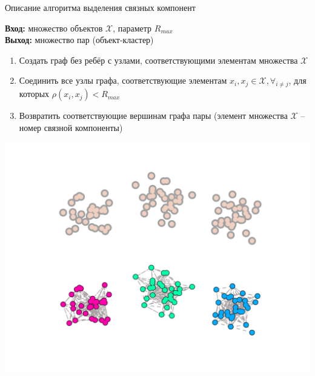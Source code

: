 \documentclass[compress,unicode]{beamer}
\begin{document}
\begin{frame}{Описание алгоритма выделения связных компонент}{}
\begin{block}{}
\small
{\bf\color{main}Вход:} множество объектов $\mathcal{X}$, параметр $R_{max}$ \\
{\bf\color{main}Выход:} множество пар (объект-кластер) \\
\begin{enumerate}
\item Создать граф без ребёр с узлами, соответствующими элементам множества $\mathcal{X}$
\item Соединить все узлы графа, соответствующие элементам $x_i, x_j \in \mathcal{X}, \forall_{i \ne j}$, для которых $\rho(x_i,x_j) < R_{max}$
\item Возвратить соответствующие вершинам графа пары (элемент множества $\mathcal{X}$ -- номер связной компоненты)
\end{enumerate}
\end{block}
\end{frame}

\begin{frame}{}
\includegraphics[width=\textwidth]{connected-components-clustering}
\end{frame}

\begin{frame}{}
\begin{block}{}
\scriptsize

\end{block}
\end{frame}
\end{document}
